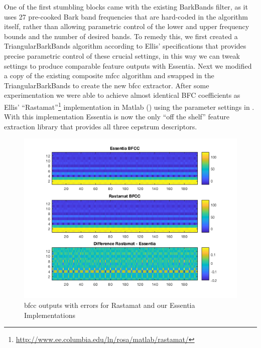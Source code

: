 {{{{One of the first stumbling blocks came with the existing BarkBands filter, as it uses 27 pre-cooked Bark band frequencies that are hard-coded in the algorithm itself, rather than allowing parametric control of the lower and upper frequency bounds and the number of desired bands. To remedy this, we first created a TriangularBarkBands algorithm according to Ellis' specifications that provides precise parametric control of these crucial settings, in this way we can tweak settings to produce comparable feature outputs with Essentia. Next we modified a copy of the existing composite \acrshort{mfcc} algorithm and swapped in the TriangularBarkBands to create the new \acrshort{bfcc} extractor. After some experimentation we were able to achieve almost identical BFC coefficients as Ellis' ``Rastamat''\footnote{\url{http://www.ee.columbia.edu/ln/rosa/matlab/rastamat/}} implementation in Matlab () using the parameter settings in . With this implementation Essentia is now the only ``off the shelf'' feature extraction library that provides all three cepstrum descriptors.

\begin{figure}
	\begin{center}
		\includegraphics[width=1.0\textwidth]{ch05_pyconcat/figures/matlab_bark.png}
	\end{center}
	\caption[BFCC outputs with errors for Rastamat and our Essentia Implementations]{\acrshort{bfcc} outputs with errors for Rastamat and our Essentia Implementations}
	\label{fig:matlab_bark}
\end{figure}

}}}}
